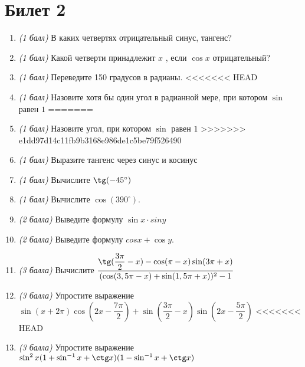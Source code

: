 \documentclass[12pt, a4paper]{article}
\begin{document}
	\section*{Билет 2}
	\begin{enumerate}
		\item \textit{(1 балл)}	В каких четвертях отрицательный синус, тангенс? 
		\item \textit{(1 балл)}	Какой четверти принадлежит $x$ , если $\cos x$ отрицательный?
		\item \textit{(1 балл)}	Переведите 150 градусов в радианы.
<<<<<<< HEAD
		\item \textit{(1 балл)}	Назовите хотя бы один угол в радианной мере, при котором $\sin$  равен $1$
=======
		\item \textit{(1 балл)}	Назовите угол, при котором $\sin$  равен $1$
>>>>>>> e1dd97d14c11fb9b3168e986de1c5be79f526490
		\item \textit{(1 балл)} Выразите тангенс через синус и косинус
		\item \textit{(1 балл)} Вычислите $\tg (-45^{\circ})$
		\item \textit{(1 балл)}	Вычислите $\cos (390^{\circ})$.
		\item \textit{(2 балла)} Выведите формулу $\sin x \cdot sin y$ 
		\item \textit{(2 балла)} Выведите формулу $cos x + \cos y$.
		\item \textit{(3 балла)} Вычислите $\dfrac{\tg(\dfrac{3\pi}{2}-x)-\cos (\pi-x) \sin (3\pi + x)}{(\cos (3,5\pi - x) + \sin (1,5\pi + x))^2-1}$
		\item \textit{(3 балла)} Упростите выражение $\sin(x+2\pi) \cos (2x-\dfrac{7\pi}{2}) + \sin (\dfrac{3\pi}{2}-x) \sin (2x-\dfrac{5\pi}{2})$
<<<<<<< HEAD
		\item \textit{(3 балла)} Упростите выражение $\sin^2 x(1+\sin^{-1}x + \ctg x)(1 - \sin^{-1}x + \ctg x)$
	\end{enumerate}
	
	\newpage 
	
\end{document}
